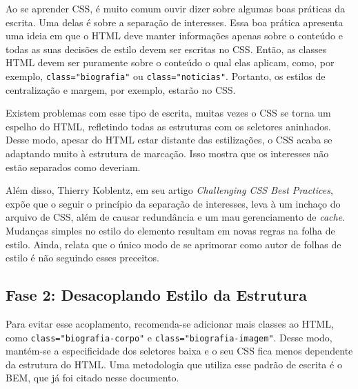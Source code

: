 Ao se aprender CSS, é muito comum ouvir dizer sobre algumas boas
práticas da escrita. Uma delas é sobre a separação de interesses. Essa
boa prática apresenta uma ideia em que o HTML deve manter informações
apenas sobre o conteúdo e todas as suas decisões de estilo devem ser
escritas no CSS. Então, as classes HTML devem ser puramente sobre o
conteúdo o qual elas aplicam, como, por exemplo,
\texttt{class="biografia"} ou \texttt{class="noticias"}. Portanto, os
estilos de centralização e margem, por exemplo, estarão no CSS.

\begin{Shaded}
\begin{Highlighting}[]
\KeywordTok{>} 
    \KeywordTok{>} 
\end{Highlighting}
\end{Shaded}

Existem problemas com esse tipo de escrita, muitas vezes o CSS se torna
um espelho do HTML, refletindo todas as estruturas com os seletores
aninhados. Desse modo, apesar do HTML estar distante das estilizações, o
CSS acaba se adaptando muito à estrutura de marcação. Isso mostra que os
interesses não estão separados como deveriam.

Além disso, Thierry Koblentz, em seu artigo \emph{Challenging CSS Best
Practices}, expõe que o seguir o princípio da separação de interesses,
leva à um inchaço do arquivo de CSS, além de causar redundância e um mau
gerenciamento de \emph{cache}. Mudanças simples no estilo do elemento
resultam em novas regras na folha de estilo. Ainda, relata que o único
modo de se aprimorar como autor de folhas de estilo é não seguindo esses
preceitos.

\hypertarget{fase-2-desacoplando-estilo-da-estrutura}{%
\subsection{Fase 2: Desacoplando Estilo da
Estrutura}\label{fase-2-desacoplando-estilo-da-estrutura}}

Para evitar esse acoplamento, recomenda-se adicionar mais classes ao
HTML, como \texttt{class="biografia-corpo"} e
\texttt{class="biografia-imagem"}. Desse modo, mantém-se a
especificidade dos seletores baixa e o seu CSS fica menos dependente da
estrutura do HTML. Uma metodologia que utiliza esse padrão de escrita é
o BEM, que já foi citado nesse documento.

